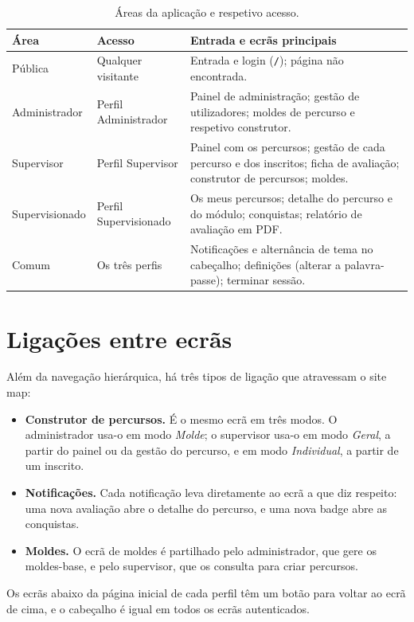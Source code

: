 \begin{table}[H]
    \centering
    \small
    \begin{tabularx}{\linewidth}{llX}
        \toprule
        \textbf{Área} & \textbf{Acesso} & \textbf{Entrada e ecrãs principais} \\
        \midrule
        Pública & Qualquer visitante & Entrada e login (\texttt{/}); página não encontrada. \\
        \midrule
        Administrador & Perfil Administrador & Painel de administração; gestão de utilizadores; moldes de percurso e respetivo construtor. \\
        \midrule
        Supervisor & Perfil Supervisor & Painel com os percursos; gestão de cada percurso e dos inscritos; ficha de avaliação; construtor de percursos; moldes. \\
        \midrule
        Supervisionado & Perfil Supervisionado & Os meus percursos; detalhe do percurso e do módulo; conquistas; relatório de avaliação em PDF. \\
        \midrule
        Comum & Os três perfis & Notificações e alternância de tema no cabeçalho; definições (alterar a palavra-passe); terminar sessão. \\
        \bottomrule
    \end{tabularx}
    \caption{Áreas da aplicação e respetivo acesso.}
    \label{tab:acessos}
\end{table}

\section{Ligações entre ecrãs}

Além da navegação hierárquica, há três tipos de ligação que atravessam o site map:

\begin{itemize}
    \item \textbf{Construtor de percursos.} É o mesmo ecrã em três modos. O administrador usa-o em modo \emph{Molde}; o supervisor usa-o em modo \emph{Geral}, a partir do painel ou da gestão do percurso, e em modo \emph{Individual}, a partir de um inscrito.
    \item \textbf{Notificações.} Cada notificação leva diretamente ao ecrã a que diz respeito: uma nova avaliação abre o detalhe do percurso, e uma nova badge abre as conquistas.
    \item \textbf{Moldes.} O ecrã de moldes é partilhado pelo administrador, que gere os moldes-base, e pelo supervisor, que os consulta para criar percursos.
\end{itemize}

Os ecrãs abaixo da página inicial de cada perfil têm um botão para voltar ao ecrã de cima, e o cabeçalho é igual em todos os ecrãs autenticados.
